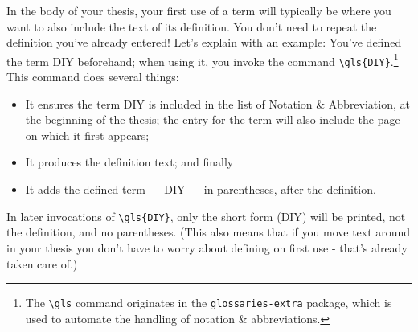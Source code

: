 In the body of your thesis, your first use of a term will typically be where you want to also include the text of its definition. You don't need to repeat the definition you've already entered! Let's explain with an example: You've defined the term \gls{DIY} beforehand; when using it, you invoke the command \verb|\gls{DIY}|.\footnote{The 
\texttt{\textbackslash{}gls} command originates in the \texttt{glossaries-extra} package, which is used to automate the handling of notation \& abbreviations.} This command does several things:
\begin{itemize}
	\item It ensures the term \gls{DIY} is included in the list of Notation \& Abbreviation, at the beginning of the thesis; the entry for the term will also include the page on which it first appears;
	\item It produces the definition text; and finally
	\item It adds the defined term --- \gls{DIY} --- in parentheses, after the definition.
\end{itemize}
In later invocations of \verb|\gls{DIY}|, only the short form (\gls{DIY}) will be printed, not the definition, and no parentheses. (This also means that if you move text around in your thesis you don't have to worry about defining on first use - that's already taken care of.) 
